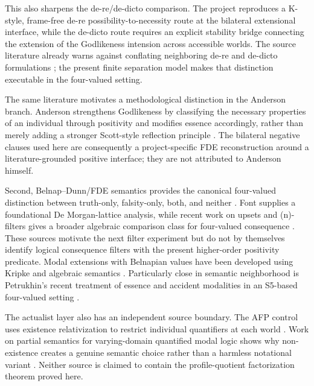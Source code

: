 This also sharpens the de-re/de-dicto comparison. The project reproduces a K-style, frame-free de-re possibility-to-necessity route at the bilateral extensional interface, while the de-dicto route requires an explicit stability bridge connecting the extension of the Godlikeness intension across accessible worlds. The source literature already warns against conflating neighboring de-re and de-dicto formulations \cite{BenzmuellerFuenmayor2019}; the present finite separation model makes that distinction executable in the four-valued setting.

The same literature motivates a methodological distinction in the Anderson branch. Anderson strengthens Godlikeness by classifying the necessary properties of an individual through positivity and modifies essence accordingly, rather than merely adding a stronger Scott-style reflection principle \cite{BenzmuellerFuenmayor2019}. The bilateral negative clauses used here are consequently a project-specific FDE reconstruction around a literature-grounded positive interface; they are not attributed to Anderson himself.

Second, Belnap--Dunn/FDE semantics provides the canonical four-valued distinction between truth-only, falsity-only, both, and neither \cite{Belnap1977,Dunn1976}. Font supplies a foundational De Morgan-lattice analysis, while recent work on upsets and (n)-filters gives a broader algebraic comparison class for four-valued consequence \cite{Font1997,Prenosil2023}. These sources motivate the next filter experiment but do not by themselves identify logical consequence filters with the present higher-order positivity predicate. Modal extensions with Belnapian values have been developed using Kripke and algebraic semantics \cite{OdintsovWansing2010,RivieccioJungJansana2017}. Particularly close in semantic neighborhood is Petrukhin's recent treatment of essence and accident modalities in an S5-based four-valued setting \cite{Petrukhin2026}.

The actualist layer also has an independent source boundary. The AFP control uses existence relativization to restrict individual quantifiers at each world \cite{FuenmayorBenzmuellerAFP}. Work on partial semantics for varying-domain quantified modal logic shows why non-existence creates a genuine semantic choice rather than a harmless notational variant \cite{Johannesson2018}. Neither source is claimed to contain the profile-quotient factorization theorem proved here.

